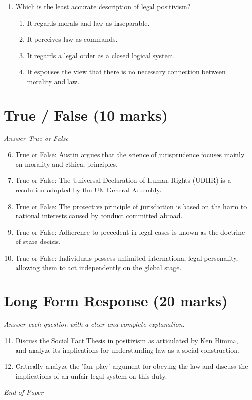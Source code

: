 \documentclass[12pt]{article}
\begin{document}
\begin{enumerate}[label=\arabic*.]
\begin{enumerate}[label=(\alph*)]
    \item It is misinterpreted as a prediction.
    \item His concept of status is misrepresented.
    \item It is taken literally.
    \item His idea is considered inapplicable to Western legal systems.
\end{enumerate}
\item Which is the least accurate description of legal positivism?
\begin{enumerate}[label=(\alph*)]
    \item It regards morals and law as inseparable.
    \item It perceives law as commands.
    \item It regards a legal order as a closed logical system.
    \item It espouses the view that there is no necessary connection between morality and law.
\end{enumerate}
\end{enumerate}

\section*{True / False (10 marks)}
\textit{Answer True or False}
\begin{enumerate}[label=\arabic*.]
\setcounter{enumi}{5}
\item True or False: Austin argues that the science of jurisprudence focuses mainly on morality and ethical principles.
\item True or False: The Universal Declaration of Human Rights (UDHR) is a resolution adopted by the UN General Assembly.
\item True or False: The protective principle of jurisdiction is based on the harm to national interests caused by conduct committed abroad.
\item True or False: Adherence to precedent in legal cases is known as the doctrine of stare decisis.
\item True or False: Individuals possess unlimited international legal personality, allowing them to act independently on the global stage.
\end{enumerate}

\section*{Long Form Response (20 marks)}
\textit{Answer each question with a clear and complete explanation.}
\begin{enumerate}[label=\arabic*.]
\setcounter{enumi}{10}
\item Discuss the Social Fact Thesis in positivism as articulated by Ken Himma, and analyze its implications for understanding law as a social construction.
\item Critically analyze the 'fair play' argument for obeying the law and discuss the implications of an unfair legal system on this duty.
\end{enumerate}

\vfill
\noindent\textit{End of Paper}
\end{document}
